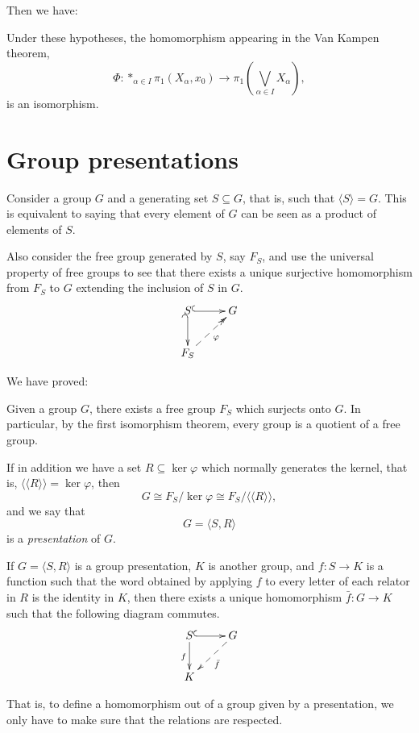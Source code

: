 Then we have:

\begin{theorem}
Under these hypotheses, the homomorphism
appearing in the
Van Kampen theorem,
$$
\Phi:\ast_{\alpha\in I}\pi_1(X_\alpha,x_0)
\to
\pi_1\left(\bigvee_{\alpha\in
I}X_\alpha\right),
$$
is an isomorphism.
\end{theorem}
\section{Group presentations}
\label{section-group-presentations}

Consider a group $G$ and a generating set
$S\subseteq G$,
that is, such that $\langle S\rangle=G$. This
is equivalent
to saying that every element of $G$ can be
seen as a product
of elements of $S$.

Also consider the free group generated by
$S$, say $F_S$,
and use the universal property of free groups
to see that
there exists a unique surjective homomorphism
from $F_S$ to
$G$ extending the inclusion of $S$ in $G$.
$$
\xymatrix{
S \ar@{^{(}->}[r]
  \ar@{_{(}->}[d]
  & G \\
F_S \ar@{-->>}[ur]_{\varphi}
}
$$

We have proved:

\begin{theorem}
Given a group $G$, there exists a free group
$F_S$ which
surjects onto $G$. In particular, by the
first isomorphism
theorem, every group is a quotient of a free
group.
\end{theorem}

If in addition we have a set
$R\subseteq\ker\varphi$ which
normally generates the kernel, that is,
$\langle\langle R\rangle\rangle=\ker\varphi$,
then
$$
G\cong F_S/\ker\varphi
\cong F_S/\langle\langle R\rangle\rangle,
$$
and we say that
$$
G=\langle S,R\rangle
$$
is a \emph{presentation} of $G$.

\begin{proposition}
If $G=\langle S,R\rangle$ is a group
presentation, $K$ is
another group, and $f:S\to K$ is a function
such that the word obtained by applying $f$
to every letter of each relator in $R$ is
the identity in $K$, then there exists a
unique homomorphism $\bar f:G\to K$
such that the following diagram commutes.
$$
\xymatrix{
S \ar@{^{(}->}[r]
  \ar[d]_{f}
  & G \ar@{-->}[dl]^{\bar f} \\
K
}
$$
\end{proposition}

That is, to define a homomorphism out of a
group given by a
presentation, we only have to make sure that
the relations
are respected.
